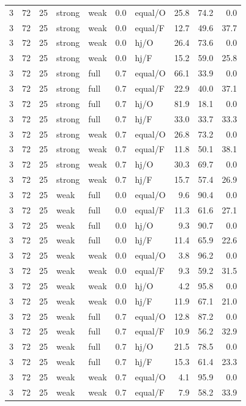 {\begin{longtable}{@{}rrrllllrrr@{}}
3 & 72 & 25 & strong & weak & 0.0 & equal/O & 25.8 & 74.2 & 0.0\\
3 & 72 & 25 & strong & weak & 0.0 & equal/F & 12.7 & 49.6 & 37.7\\
3 & 72 & 25 & strong & weak & 0.0 & hj/O & 26.4 & 73.6 & 0.0\\
3 & 72 & 25 & strong & weak & 0.0 & hj/F & 15.2 & 59.0 & 25.8\\
3 & 72 & 25 & strong & full & 0.7 & equal/O & 66.1 & 33.9 & 0.0\\
3 & 72 & 25 & strong & full & 0.7 & equal/F & 22.9 & 40.0 & 37.1\\
3 & 72 & 25 & strong & full & 0.7 & hj/O & 81.9 & 18.1 & 0.0\\
3 & 72 & 25 & strong & full & 0.7 & hj/F & 33.0 & 33.7 & 33.3\\
3 & 72 & 25 & strong & weak & 0.7 & equal/O & 26.8 & 73.2 & 0.0\\
3 & 72 & 25 & strong & weak & 0.7 & equal/F & 11.8 & 50.1 & 38.1\\
3 & 72 & 25 & strong & weak & 0.7 & hj/O & 30.3 & 69.7 & 0.0\\
3 & 72 & 25 & strong & weak & 0.7 & hj/F & 15.7 & 57.4 & 26.9\\
3 & 72 & 25 & weak & full & 0.0 & equal/O & 9.6 & 90.4 & 0.0\\
3 & 72 & 25 & weak & full & 0.0 & equal/F & 11.3 & 61.6 & 27.1\\
3 & 72 & 25 & weak & full & 0.0 & hj/O & 9.3 & 90.7 & 0.0\\
3 & 72 & 25 & weak & full & 0.0 & hj/F & 11.4 & 65.9 & 22.6\\
3 & 72 & 25 & weak & weak & 0.0 & equal/O & 3.8 & 96.2 & 0.0\\
3 & 72 & 25 & weak & weak & 0.0 & equal/F & 9.3 & 59.2 & 31.5\\
3 & 72 & 25 & weak & weak & 0.0 & hj/O & 4.2 & 95.8 & 0.0\\
3 & 72 & 25 & weak & weak & 0.0 & hj/F & 11.9 & 67.1 & 21.0\\
3 & 72 & 25 & weak & full & 0.7 & equal/O & 12.8 & 87.2 & 0.0\\
3 & 72 & 25 & weak & full & 0.7 & equal/F & 10.9 & 56.2 & 32.9\\
3 & 72 & 25 & weak & full & 0.7 & hj/O & 21.5 & 78.5 & 0.0\\
3 & 72 & 25 & weak & full & 0.7 & hj/F & 15.3 & 61.4 & 23.3\\
3 & 72 & 25 & weak & weak & 0.7 & equal/O & 4.1 & 95.9 & 0.0\\
3 & 72 & 25 & weak & weak & 0.7 & equal/F & 7.9 & 58.2 & 33.9\\

\end{longtable}}

